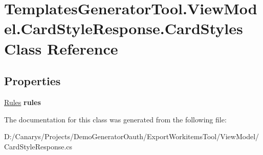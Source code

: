 \hypertarget{class_templates_generator_tool_1_1_view_model_1_1_card_style_response_1_1_card_styles}{}\section{Templates\+Generator\+Tool.\+View\+Model.\+Card\+Style\+Response.\+Card\+Styles Class Reference}
\label{class_templates_generator_tool_1_1_view_model_1_1_card_style_response_1_1_card_styles}
\subsection*{Properties}
\begin{DoxyCompactItemize}
\item 
\mbox{\label{class_templates_generator_tool_1_1_view_model_1_1_card_style_response_1_1_card_styles_abda57089ab01977073c7ef845602cdda}} 
\mbox{\hyperlink{class_templates_generator_tool_1_1_view_model_1_1_card_style_response_1_1_rules}{Rules}} {\bfseries rules}
\end{DoxyCompactItemize}


The documentation for this class was generated from the following file\+:\begin{DoxyCompactItemize}
\item 
D\+:/\+Canarys/\+Projects/\+Demo\+Generator\+Oauth/\+Export\+Workitems\+Tool/\+View\+Model/Card\+Style\+Response.\+cs\end{DoxyCompactItemize}

